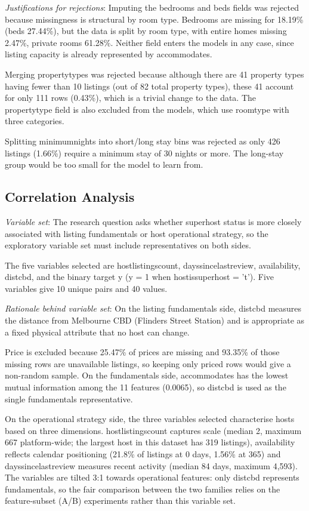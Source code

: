 \documentclass[final,1p,11pt]{elsarticle}
\renewcommand\_{\textunderscore\allowbreak}%
\begin{document}
\textit{Justifications for rejections}: Imputing the bedrooms and beds fields was rejected because missingness is structural by room type. Bedrooms are missing for 18.19\% (beds 27.44\%), but the data is split by room type, with entire homes missing 2.47\%, private rooms 61.28\%. Neither field enters the models in any case, since listing capacity is already represented by accommodates.

Merging property\_types was rejected because although there are 41 property types having fewer than 10 listings (out of 82 total property types), these 41 account for only 111 rows (0.43\%), which is a trivial change to the data. The property\_type field is also excluded from the models, which use room\_type\_3 with three categories.

Splitting minimum\_nights into short/long stay bins was rejected as only 426 listings (1.66\%) require a minimum stay of 30 nights or more. The long-stay group would be too small for the model to learn from.

\subsection{Correlation Analysis}

\textit{Variable set}: The research question asks whether superhost status is more closely associated with listing fundamentals or host operational strategy, so the exploratory variable set must include representatives on both sides.

The five variables selected are host\_listings\_count, days\_since\_last\_review, availability\_365, dist\_cbd, and the binary target y (y = 1 when host\_is\_superhost = 't'). Five variables give 10 unique pairs and 40 values.

\textit{Rationale behind variable set}: On the listing fundamentals side, dist\_cbd measures the distance from Melbourne CBD (Flinders Street Station) and is appropriate as a fixed physical attribute that no host can change.

Price is excluded because 25.47\% of prices are missing and 93.35\% of those missing rows are unavailable listings, so keeping only priced rows would give a non-random sample. On the fundamentals side, accommodates has the lowest mutual information among the 11 features (0.0065), so dist\_cbd is used as the single fundamentals representative.

On the operational strategy side, the three variables selected characterise hosts based on three dimensions. host\_listings\_count captures scale (median 2, maximum 667 platform-wide; the largest host in this dataset has 319 listings), availability\_365 reflects calendar positioning (21.8\% of listings at 0 days, 1.56\% at 365) and days\_since\_last\_review measures recent activity (median 84 days, maximum 4,593). The variables are tilted 3:1 towards operational features: only dist\_cbd represents fundamentals, so the fair comparison between the two families relies on the feature-subset (A/B) experiments rather than this variable set.
\end{document}
